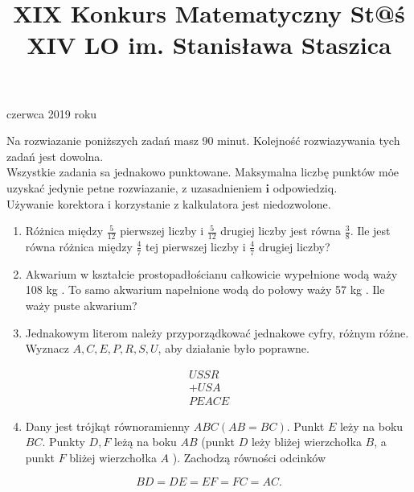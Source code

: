 \documentclass[10pt]{article}
\title{XIX Konkurs Matematyczny St@ś \\
 XIV LO im. Stanisława Staszica }
\author{}
\date{}
\begin{document}
 czerwca 2019 roku

Na rozwiazanie poniższych zadań masz 90 minut. Kolejność rozwiazywania tych zadań jest dowolna.\\
Wszystkie zadania sa jednakowo punktowane. Maksymalna liczbę punktów mȯ̇e uzyskać jedynie petne rozwiazanie, z uzasadnieniem \(\boldsymbol{i}\) odpowiedziq.\\
Używanie korektora i korzystanie z kalkulatora jest niedozwolone.

\begin{enumerate}
  \item Różnica między \(\frac{5}{12}\) pierwszej liczby i \(\frac{5}{12}\) drugiej liczby jest równa \(\frac{3}{8}\). Ile jest równa różnica między \(\frac{4}{7}\) tej pierwszej liczby i \(\frac{4}{7}\) drugiej liczby?
  \item Akwarium w kształcie prostopadłościanu całkowicie wypełnione wodą waży 108 kg . To samo akwarium napełnione wodą do połowy waży 57 kg . Ile waży puste akwarium?
  \item Jednakowym literom należy przyporządkować jednakowe cyfry, różnym różne. Wyznacz \(A, C, E, P, R, S, U\), aby działanie było poprawne.
\end{enumerate}

\[
\begin{array}{r}
U S S R \\
+U S A \\
\hline P E A C E
\end{array}
\]

\begin{enumerate}
  \setcounter{enumi}{3}
  \item Dany jest trójkąt równoramienny \(A B C(A B=B C)\). Punkt \(E\) leży na boku \(B C\). Punkty \(D, F\) leżą na boku \(A B\) (punkt \(D\) leży bliż̇ej wierzchołka \(B\), a punkt \(F\) bliżej wierzchołka \(A\) ). Zachodzą równości odcinków
\end{enumerate}

\[
B D=D E=E F=F C=A C .
\]
\end{document}
